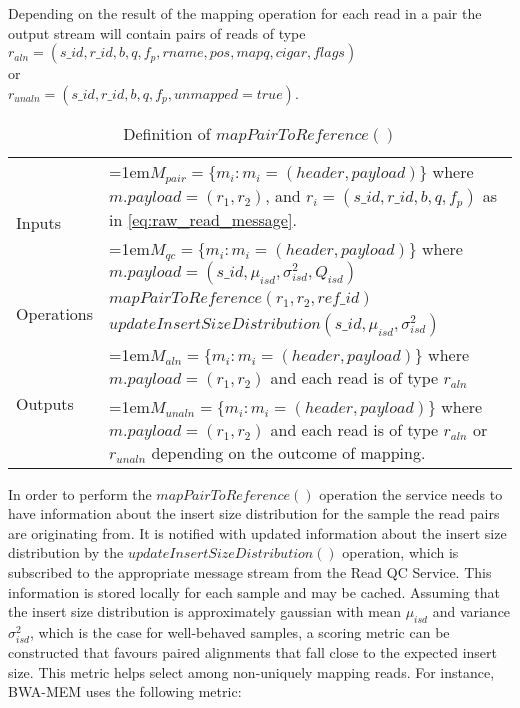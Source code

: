 Depending on the result of the mapping operation for each read in a pair the output stream will contain pairs of reads of type \newline
$r_{aln} = (s\_id, r\_id, b, q, f_p, rname, pos, mapq, cigar, flags)$\\
or \\
$r_{unaln} = (s\_id, r\_id, b, q, f_p, unmapped=true)$. 

\bgroup
\def\arraystretch{1.5}
\begin{table}[!ht]
    \caption{Definition of $mapPairToReference()$}
    \label{tab:op_map_pair_to_reference}
    {\begin{tabular}{l|p{12cm}}
    \toprule
    \multirow{2}{*}{Inputs} & \hangindent=1em$M_{pair} = \{m_i: m_i = (header, payload)\}$ where $m.payload = (r_1,r_2)$, and $r_i = (s\_id, r\_id, b, q, f_p)$ as in \ref{eq:raw_read_message}. \\
    & \hangindent=1em$M_{qc} = \{m_i: m_i = (header, payload)\}$ where $m.payload = (s\_id, \mu_{isd}, \sigma_{isd}^2, Q_{isd})$\\
    \cline{2-2}
    \multirow{2}{*}{Operations} & $mapPairToReference(r_1,r_2, ref\_id)$\\
    & $updateInsertSizeDistribution(s\_id,\mu_{isd}, \sigma_{isd}^2)$\\
    \cline{2-2}
    \multirow{2}{*}{Outputs} & \hangindent=1em$M_{aln} = \{m_i: m_i = (header, payload)\}$ where $m.payload = (r_1,r_2)$ and each read is of type $r_{aln}$\\
    & \hangindent=1em$M_{unaln} = \{m_i: m_i = (header, payload)\}$ where $m.payload = (r_1,r_2)$ and each read is of type $r_{aln}$ or $r_{unaln}$ depending on the outcome of mapping.\\
    \bottomrule
    \end{tabular}}
\end{table}
\egroup
\newpage
In order to perform the $mapPairToReference()$ operation the service needs to have information about the insert size distribution for the sample the read pairs are originating from. It is notified with updated information about the insert size distribution by the $updateInsertSizeDistribution()$ operation, which is subscribed to the appropriate message stream from the Read QC Service. This information is stored locally for each sample and may be cached. Assuming that the insert size distribution is approximately gaussian with mean $\mu_{isd}$ and variance $\sigma_{isd}^2$, which is the case for well-behaved samples, a scoring metric can be constructed that favours paired alignments that fall close to the expected insert size. This metric helps select among non-uniquely mapping reads. For instance, BWA-MEM uses the following metric:

